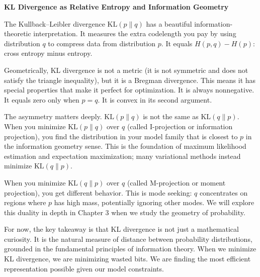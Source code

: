 \begin{geometrylens}
\textbf{KL Divergence as Relative Entropy and Information Geometry}

\vspace{0.5em}

The Kullback--Leibler divergence $\text{KL}(p \| q)$ has a beautiful information-theoretic interpretation. It measures the extra codelength you pay by using distribution $q$ to compress data from distribution $p$. It equals $H(p, q) - H(p)$: cross entropy minus entropy.

\vspace{0.5em}

Geometrically, KL divergence is not a metric (it is not symmetric and does not satisfy the triangle inequality), but it is a Bregman divergence. This means it has special properties that make it perfect for optimization. It is always nonnegative. It equals zero only when $p = q$. It is convex in its second argument.

\vspace{0.5em}

The asymmetry matters deeply. $\text{KL}(p \| q)$ is not the same as $\text{KL}(q \| p)$. When you minimize $\text{KL}(p \| q)$ over $q$ (called I-projection or information projection), you find the distribution in your model family that is closest to $p$ in the information geometry sense. This is the foundation of maximum likelihood estimation and expectation maximization; many variational methods instead minimize $\text{KL}(q \| p)$.

\vspace{0.5em}

When you minimize $\text{KL}(q \| p)$ over $q$ (called M-projection or moment projection), you get different behavior. This is mode seeking: $q$ concentrates on regions where $p$ has high mass, potentially ignoring other modes. We will explore this duality in depth in Chapter 3 when we study the geometry of probability.

\vspace{0.5em}

For now, the key takeaway is that KL divergence is not just a mathematical curiosity. It is the natural measure of distance between probability distributions, grounded in the fundamental principles of information theory. When we minimize KL divergence, we are minimizing wasted bits. We are finding the most efficient representation possible given our model constraints.
\end{geometrylens}



